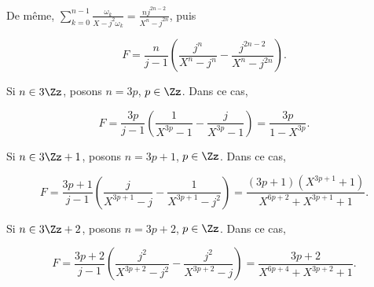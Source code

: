 {{De même, $\sum_{k=0}^{n-1}\frac{\omega_{k}}{X-j^2\omega_{k}}=\frac{nj^{2n-2}}{X^n-j^{2n}}$, puis 

$$F=\frac{n}{j-1}(\frac{j^n}{X^n-j^n}-\frac{j^{2n-2}}{X^n-j^{2n}}).$$

Si $n\in3\Zz$, posons $n=3p$, $p\in\Zz$. Dans ce cas,

$$F=\frac{3p}{j-1}(\frac{1}{X^{3p}-1}-\frac{j}{X^{3p}-1})=\frac{3p}{1-X^{3p}}.$$
 
Si $n\in3\Zz+1$, posons $n=3p+1$, $p\in\Zz$. Dans ce cas,

$$F=\frac{3p+1}{j-1}(\frac{j}{X^{3p+1}-j}-\frac{1}{X^{3p+1}-j^2})=\frac{(3p+1)(X^{3p+1}+1)}{X^{6p+2}+X^{3p+1}+1}.$$
 
Si $n\in3\Zz+2$, posons $n=3p+2$, $p\in\Zz$. Dans ce cas,

$$F=\frac{3p+2}{j-1}(\frac{j^2}{X^{3p+2}-j^2}-\frac{j^2}{X^{3p+2}-j})=\frac{3p+2}{X^{6p+4}+X^{3p+2}+1}.$$
}
}
